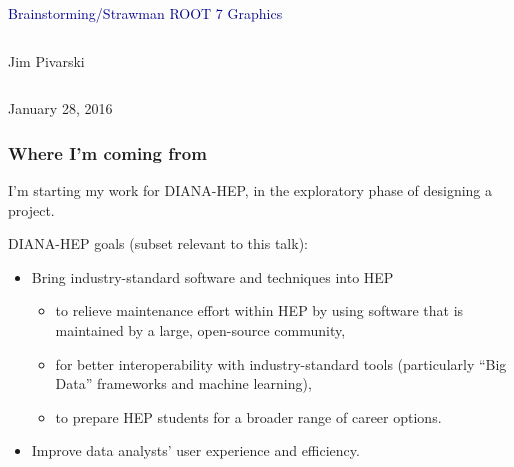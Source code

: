 \documentclass[compress]{beamer}
\begin{document}
\begin{frame}
\vfill
\begin{center}
\textcolor{darkblue}{\Large Brainstorming/Strawman ROOT 7 Graphics}

\vfill
\begin{columns}
\begin{center}
\large
Jim Pivarski
\end{center}
\end{columns}


\vfill
January 28, 2016

\end{center}
\end{frame}

\small

\begin{frame}
\frametitle{Where I'm coming from}
I'm starting my work for DIANA-HEP, in the exploratory phase of designing a project.

\vfill
DIANA-HEP goals (subset relevant to this talk):
\begin{itemize}
\item Bring industry-standard software and techniques into HEP
\begin{itemize}
\item to relieve maintenance effort within HEP by using software that is maintained by a large, open-source community,
\item for better interoperability with industry-standard tools (particularly ``Big Data'' frameworks and machine learning),
\item to prepare HEP students for a broader range of career options.
\end{itemize}
\item Improve data analysts' user experience and efficiency.
\end{itemize}
\end{frame}
\end{document}
